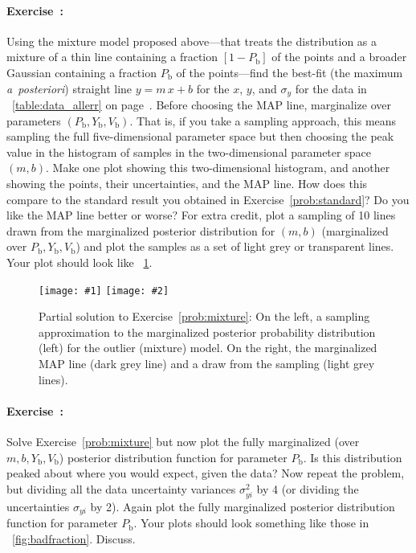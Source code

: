 \documentclass[12pt,twoside]{article}
\newcommand{\exampleplottwo}[2]{%
\begin{center}%
\texttt{[image: \#1]}%
\texttt{[image: \#2]}%
\end{center}%
}
\newcommand{\notenglish}[1]{\textsl{#1}}
\newcommand{\aposteriori}{\notenglish{a~posteriori}}
\newcommand{\problemname}{Exercise}
\newcounter{problem}
\newenvironment{problem}{\paragraph{\problemname~\theproblem:}\refstepcounter{problem}}{}
\newcommand{\Pbad}{P_{\mathrm{b}}}
\newcommand{\Ybad}{Y_{\mathrm{b}}}
\newcommand{\Vbad}{V_{\mathrm{b}}}
\begin{document}
\begin{problem}\label{prob:mixture}
Using the mixture model proposed above---that treats the distribution
as a mixture of a thin line containing a fraction $[1-\Pbad]$ of the
points and a broader Gaussian containing a fraction $\Pbad$ of the
points---find the best-fit (the maximum \aposteriori) straight line
$y=m\,x+b$ for the $x$, $y$, and $\sigma_y$ for the data in
\tablename~\ref{table:data_allerr} on
page~\pageref{table:data_allerr}.  Before choosing the MAP line,
marginalize over parameters $(\Pbad,\Ybad,\Vbad)$.  That is, if you
take a sampling approach, this means sampling the full
five-dimensional parameter space but then choosing the peak value in
the histogram of samples in the two-dimensional parameter space
$(m,b)$.  Make one plot showing this two-dimensional histogram, and
another showing the points, their uncertainties, and the MAP line.
How does this compare to the standard result you obtained in
\problemname~\ref{prob:standard}?  Do you like the MAP line better or
worse?  For extra credit, plot a sampling of 10 lines drawn from the
marginalized posterior distribution for $(m,b)$ (marginalized over
$\Pbad,\Ybad,\Vbad$) and plot the samples as a set of light grey or
transparent lines.  Your plot should look like
\figurename~\ref{fig:mixture}.
\end{problem}

\begin{figure}[htbp]
\exampleplottwo{exMix1a}{exMix1b}
\caption{Partial solution to \problemname~\ref{prob:mixture}: On the
left, a sampling approximation to the marginalized posterior
probability distribution (left) for the outlier (mixture) model.  On
the right, the marginalized MAP line (dark grey line) and a draw from
the sampling (light grey lines).}\label{fig:mixture}
\end{figure}

\begin{problem}\label{prob:badfraction}
Solve \problemname~\ref{prob:mixture} but now plot the fully
marginalized (over $m,b,\Ybad,\Vbad$) posterior distribution function
for parameter $\Pbad$.  Is this distribution peaked about where you
would expect, given the data?  Now repeat the problem, but dividing
all the data uncertainty variances $\sigma_{yi}^2$ by 4 (or dividing
the uncertainties $\sigma_{yi}$ by 2).  Again plot the fully
marginalized posterior distribution function for parameter $\Pbad$.
Your plots should look something like those in
\figurename~\ref{fig:badfraction}.  Discuss.
\end{problem}
\end{document}
